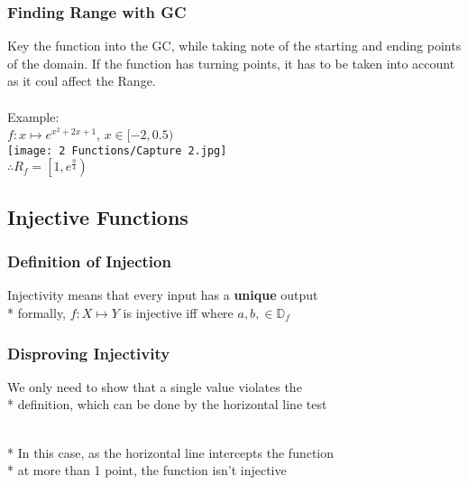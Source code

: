 \documentclass[../main.tex]{subfiles}
\begin{document}
\subsubsection{Finding Range with GC}
Key the function into the GC, while taking note of the starting and ending points of the domain.
If the function has turning points, it has to be taken into account as it coul affect the Range. \\\\
Example: \\
\(\displaystyle f:x \mapsto e^{x^{2}+2x+1}\), \(x \in [-2,0.5)\) \\
\texttt{[image: 2 Functions/Capture 2.jpg]} \\
\(\therefore R_{f} = \left[1,e^{\textstyle \frac{9}{4}}\right)\)

\subsection{Injective Functions}
\subsubsection{Definition of Injection}
Injectivity means that every input has a \textbf{unique} output \\*
formally, \(f: X \mapsto Y\) is injective iff
where \(a,b, \in \mathbb{D}_{f}\)

\subsubsection{Disproving Injectivity}
We only need to show that a single value violates the \\*
definition, which can be done by the horizontal line test \\

 \\*
In this case, as the horizontal line intercepts the function\\*
at more than 1 point, the function isn't injective
\end{document}
